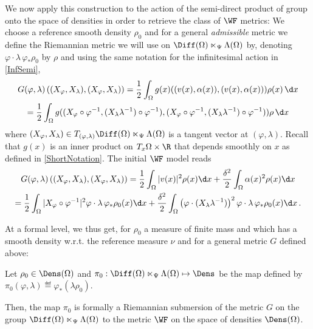 We now apply this construction to the action of the semi-direct product of group onto the space of densities in order to retrieve the class of $\WF$ metrics: We choose a reference smooth density $\rho_0$ and for a general \textit{admissible} metric we define the Riemannian metric we will use on $\Diff(\Omega) \ltimes_\Psi \Lambda(\Omega)$ by, denoting $\varphi \cdot \lambda \, \varphi_*\rho_0$ by $\rho$ and using the same notation for the infinitesimal action in \eqref{InfSemi},
\begin{multline}
G(\varphi,\lambda)\left((X_\varphi,X_\lambda) , (X_\varphi,X_\lambda)\right)= \frac{1}{2} \int_{\Omega} g(x)((v(x),\alpha(x)),(v(x),\alpha(x))) \rho(x) \, \d x  \\
= \frac{1}{2} \int_{\Omega} g((X_\varphi \circ \varphi^{-1},(X_\lambda \lambda^{-1}) \circ \varphi^{-1}),(X_\varphi \circ \varphi^{-1},(X_\lambda \lambda^{-1}) \circ \varphi^{-1})) \rho \,\d x  
\end{multline}
where $(X_\varphi,X_\lambda) \in T_{(\varphi,\lambda)}\Diff(\Omega) \ltimes_\Psi \Lambda(\Omega)$ is a tangent vector at $(\varphi,\lambda)$. Recall that $g(x)$ is an inner product on $T_x\Omega \times \R$ that depends smoothly on $x$ as defined in \eqref{ShortNotation}.
The initial $\WF$ model reads
\begin{multline}
G(\varphi,\lambda)\left((X_\varphi,X_\lambda) , (X_\varphi,X_\lambda)\right)= \frac{1}{2} \int_{\Omega} | v(x)  |^2 \rho(x) \d x + \frac{\delta^2}{2} \int_{\Omega}   \alpha(x)^2  \rho(x) \d x \\
= \frac{1}{2} \int_{\Omega} | X_\varphi \circ \varphi^{-1}  |^2 \varphi \cdot \lambda \, \varphi_* \rho_0(x) \d x + \frac{\delta^2}{2}   \int_{\Omega} \left( \varphi \cdot (X_\lambda \lambda^{-1}) \right)^2 \varphi \cdot \lambda \,  \varphi_* \rho_0(x) \d x\,.
\end{multline}





At a formal level, we thus get, for $\rho_0$ a measure of finite mass and which has a smooth density w.r.t. the reference measure $\nu$ and for a general metric $G$ defined above:

\begin{proposition}\label{Submersion}
Let $\rho_0 \in \Dens(\Omega)$ and $\pi_0:\Diff(\Omega) \ltimes_\Psi \Lambda(\Omega) \mapsto \Dens$ be the map defined by $\pi_0(\varphi, \lambda) \eqdef \varphi_*(\lambda \rho_0)$.

Then, the map $\pi_0$ is formally a Riemannian submersion of the metric $G$ on the group $\Diff(\Omega) \ltimes_\Psi \Lambda(\Omega)$ to the metric $\WF$ on the space of densities $\Dens(\Omega)$.
\end{proposition}

